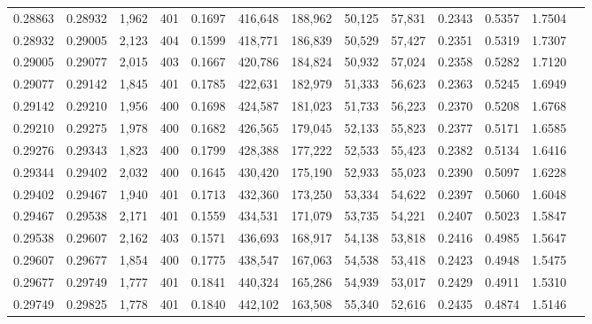 \begin{tabular}{rrrrrrrrrrrrr}
0.28863 & 0.28932 &  1,962 & 401 &                                     0.1697 & 416,648 & 188,962 &  50,125 &  57,831 & 0.2343 & 0.5357 & 1.7504 \\
0.28932 & 0.29005 &  2,123 & 404 &                                     0.1599 & 418,771 & 186,839 &  50,529 &  57,427 & 0.2351 & 0.5319 & 1.7307 \\
0.29005 & 0.29077 &  2,015 & 403 &                                     0.1667 & 420,786 & 184,824 &  50,932 &  57,024 & 0.2358 & 0.5282 & 1.7120 \\
0.29077 & 0.29142 &  1,845 & 401 &                                     0.1785 & 422,631 & 182,979 &  51,333 &  56,623 & 0.2363 & 0.5245 & 1.6949 \\
0.29142 & 0.29210 &  1,956 & 400 &                                     0.1698 & 424,587 & 181,023 &  51,733 &  56,223 & 0.2370 & 0.5208 & 1.6768 \\
0.29210 & 0.29275 &  1,978 & 400 &                                     0.1682 & 426,565 & 179,045 &  52,133 &  55,823 & 0.2377 & 0.5171 & 1.6585 \\
0.29276 & 0.29343 &  1,823 & 400 &                                     0.1799 & 428,388 & 177,222 &  52,533 &  55,423 & 0.2382 & 0.5134 & 1.6416 \\
0.29344 & 0.29402 &  2,032 & 400 &                                     0.1645 & 430,420 & 175,190 &  52,933 &  55,023 & 0.2390 & 0.5097 & 1.6228 \\
0.29402 & 0.29467 &  1,940 & 401 &                                     0.1713 & 432,360 & 173,250 &  53,334 &  54,622 & 0.2397 & 0.5060 & 1.6048 \\
0.29467 & 0.29538 &  2,171 & 401 &                                     0.1559 & 434,531 & 171,079 &  53,735 &  54,221 & 0.2407 & 0.5023 & 1.5847 \\
0.29538 & 0.29607 &  2,162 & 403 &                                     0.1571 & 436,693 & 168,917 &  54,138 &  53,818 & 0.2416 & 0.4985 & 1.5647 \\
0.29607 & 0.29677 &  1,854 & 400 &                                     0.1775 & 438,547 & 167,063 &  54,538 &  53,418 & 0.2423 & 0.4948 & 1.5475 \\
0.29677 & 0.29749 &  1,777 & 401 &                                     0.1841 & 440,324 & 165,286 &  54,939 &  53,017 & 0.2429 & 0.4911 & 1.5310 \\
0.29749 & 0.29825 &  1,778 & 401 &                                     0.1840 & 442,102 & 163,508 &  55,340 &  52,616 & 0.2435 & 0.4874 & 1.5146 \\

\end{tabular}
